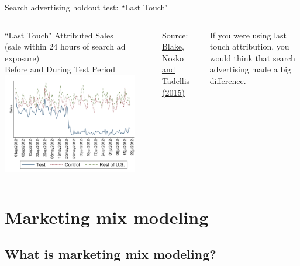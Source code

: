 \documentclass[10pt, aspectratio=169]{beamer}
\newcommand{\source}[1]{\begin{flushright} \footnotesize Source: {#1} \end{flushright} \normalsize}
\begin{document}
\begin{frame}{Search advertising holdout test: ``Last Touch"}
\begin{columns}[t]
\centering
``Last Touch" Attributed Sales \\
(sale within 24 hours of search ad exposure)\\
Before and During Test Period\\
\includegraphics[width=0.9\textwidth]{images/blakeetallasttouch.png}\\
\source{\href{https://drive.google.com/uc?export=download&id=0B0EzanlzLNsWU1BkWnFxZlZuZUE}{Blake, Nosko and Tadellis (2015)}}
\alert{If you were using last touch attribution, you would think that search advertising made a big difference.}
\end{columns}
\end{frame}

\section{Marketing mix modeling}

\subsection{What is marketing mix modeling?}
\end{document}

